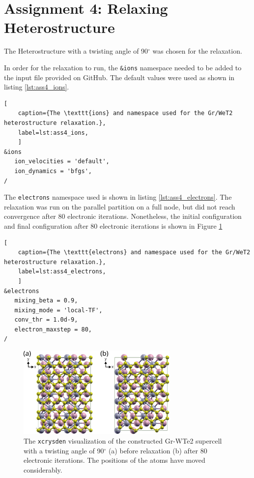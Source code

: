 \documentclass[10pt,a4paper]{labreport}
\begin{document}
 \newpage
 \section{Assignment 4: Relaxing Heterostructure}
The Heterostructure with a twisting angle of 90$^\circ$ was chosen for the relaxation. 

In order for the relaxation to run, the \texttt{\&ions} namespace needed to be added to the input file provided on GitHub. The default values were used as shown in listing \ref{lst:ass4_ions}.  
\begin{lstlisting}[ 
    caption={The \texttt{ions} and namespace used for the Gr/WeT2 heterostructure relaxation.},
    label=lst:ass4_ions,
    ]
&ions
   ion_velocities = 'default',
   ion_dynamics = 'bfgs',
/
\end{lstlisting}
The \texttt{electrons} namespace used is shown in listing \ref{lst:ass4_electrons}. The relaxation was run on the parallel partition on a full node, but did not reach convergence after 80 electronic iterations. Nonetheless, the initial configuration and final configuration after 80 electronic iterations is shown in Figure \ref{fig:ass4_final_struct}
\begin{lstlisting}[ 
    caption={The \texttt{electrons} and namespace used for the Gr/WeT2 heterostructure relaxation.},
    label=lst:ass4_electrons,
    ]
&electrons
   mixing_beta = 0.9,
   mixing_mode = 'local-TF',
   conv_thr = 1.0d-9,
   electron_maxstep = 80,
/
\end{lstlisting} 
\begin{figure}[h!]
  \centering 
  \includegraphics[width = 0.7\textwidth]{figs/ass4_final_struct.png}
  \caption{The \texttt{xcrysden} visualization of the constructed Gr-WTe2 supercell with a twisting angle of 90$^\circ$ (a) before relaxation (b) after 80 electronic iterations. The positions of the atoms have moved considerably.}
  \label{fig:ass4_final_struct}
\end{figure}





\printbibliography

%   
\end{document}
